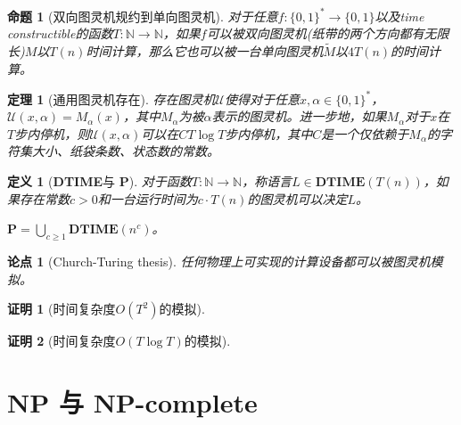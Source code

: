 \documentclass[8pt]{article}
\theoremstyle{compact}
\newtheorem{theorem}{定理}
\newtheorem{definition}{定义}
\newtheorem{proposition}{命题}
\newtheorem{thesis}{论点}
\newtheorem{Proof}{证明}
\def\ge{\geqslant}
\def\DTIME{\textbf{DTIME}}
\def\P{\textbf{P}}
\begin{document}
\begin{proposition}[双向图灵机规约到单向图灵机]
	对于任意$f: \{0, 1\}^* \to \{0, 1\}$以及time constructible的函数$T: \mathbb{N} \to \mathbb{N}$，如果$f$可以被双向图灵机(纸带的两个方向都有无限长)$M$以$T(n)$时间计算，那么它也可以被一台单向图灵机$\tilde{M}$以$4T(n)$的时间计算。
\end{proposition}
\begin{theorem}[通用图灵机存在]
	存在图灵机$\mathcal U$使得对于任意$x, \alpha \in \{0, 1\}^*$，$\mathcal U(x, \alpha) = M_{\alpha}(x)$，其中$M_{\alpha}$为被$\alpha$表示的图灵机。进一步地，如果$M_{\alpha}$对于$x$在$T$步内停机，则$\mathcal U(x, \alpha)$可以在$CT\log T$步内停机，其中$C$是一个仅依赖于$M_{\alpha}$的字符集大小、纸袋条数、状态数的常数。
\end{theorem}
\begin{definition}[\DTIME 与 \P]
	对于函数$T: \mathbb N \to \mathbb N$，称语言$L \in \DTIME(T(n))$，如果存在常数$c > 0$和一台运行时间为$c \cdot T(n)$的图灵机可以决定$L$。

	$\P = \bigcup_{c \ge 1}\DTIME(n^c)$。
\end{definition}
\begin{thesis}[Church-Turing thesis]
	任何物理上可实现的计算设备都可以被图灵机模拟。
\end{thesis}

\begin{Proof}[时间复杂度$O(T^2)$的模拟]
	
\end{Proof}
\begin{Proof}[时间复杂度$O(T  \log T)$的模拟]
	
\end{Proof}


\newpage
\section{NP 与 NP-complete}
\end{document}
